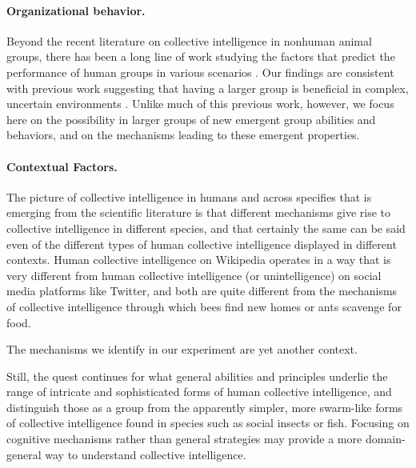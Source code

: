 \documentclass[12pt,letterpaper]{article}
\begin{document}
\paragraph{Organizational behavior.}

Beyond the recent literature on collective intelligence in nonhuman animal groups, there has been a long line of work studying the factors that predict the performance of human groups in various scenarios \cite{kerr_group_2004}.  
Our findings are consistent with previous work suggesting that having a larger group is beneficial in complex, uncertain environments \cite{stewart_meta-analytic_2006}.  
Unlike much of this previous work, however, we focus here on the possibility in larger groups of new emergent group abilities and behaviors, and on the mechanisms leading to these emergent properties.


\paragraph{Contextual Factors.}

The picture of collective intelligence in humans and across specifies that is emerging from the scientific literature is that different mechanisms give rise to collective intelligence in different species, and that certainly the same can be said even of the different types of human collective intelligence displayed in different contexts.  Human collective intelligence on Wikipedia operates in a way that is very different from human collective intelligence (or unintelligence) on social media platforms like Twitter, and both are quite different from the mechanisms of collective intelligence through which bees find new homes or ants scavenge for food. 

The mechanisms we identify in our experiment are yet another context.

Still, the quest continues for what general abilities and principles underlie the range of intricate and sophisticated forms of human collective intelligence, and distinguish those as a group from the apparently simpler, more swarm-like forms of collective intelligence found in species such as social insects or fish.  Focusing on cognitive mechanisms rather than general strategies may provide a more domain-general way to understand collective intelligence.
\end{document}
